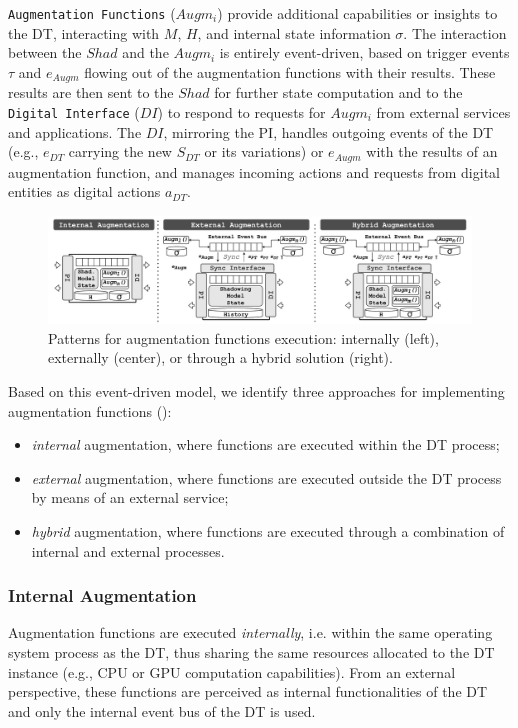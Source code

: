 \texttt{Augmentation Functions} (\( Augm_{i} \)) provide additional capabilities or insights to the \ac{DT}, interacting with \( M \), \( H \), and internal state information \( \sigma \).
The interaction between the \( Shad \) and the \( Augm_{i} \) is entirely event-driven, based on trigger events \( \tau \) and \( e_{Augm} \) flowing out of the augmentation functions with their results.
These results are then sent to the \( Shad \) for further state computation and to the \texttt{Digital Interface} (\( DI \)) to respond to requests for \( Augm_{i} \) from external services and applications.
The \( DI \), mirroring the \ac{PI}, handles outgoing events of the \ac{DT} (e.g., \( e_{DT} \) carrying the new \( S_{DT} \) or its variations) or \( e_{Augm} \) with the results of an augmentation function, and manages incoming actions and requests from digital entities as digital actions \( a_{DT} \).

\begin{figure}
    \centering
    \includegraphics[width=\textwidth]{figures/augmentation_patterns.pdf}
    \caption{Patterns for augmentation functions execution: internally (left), externally (center), or through a hybrid solution (right).}
    \label{fig:augm_function_event_driven_patterns}
\end{figure}


Based on this event-driven model, we identify three approaches for implementing augmentation functions ():
\begin{itemize}
    \item \textit{internal} augmentation, where functions are executed within the \ac{DT} process;
    \item \textit{external} augmentation, where functions are executed outside the \ac{DT} process by means of an external service;
    \item \textit{hybrid} augmentation, where functions are executed through a combination of internal and external processes.
\end{itemize}

\subsubsection{Internal Augmentation}
Augmentation functions are executed \textit{internally}, i.e. within the same operating system process as the \ac{DT}, thus sharing the same resources allocated to the \ac{DT} instance (e.g., CPU or GPU computation capabilities).
From an external perspective, these functions are perceived as internal functionalities of the \ac{DT} and only the internal event bus of the \ac{DT} is used.

